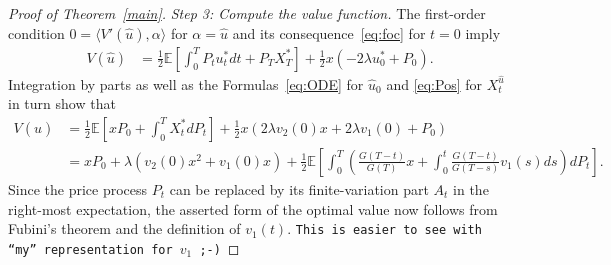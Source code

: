 \documentclass[11pt]{article}
\theoremstyle{definition}
\theoremstyle{remark}
\newcommand{\E}{\mathbb{E}} %
\newcommand{\ts}{\textstyle}
\begin{document}
\begin{proof}[Proof of Theorem~\ref{main}]
\emph{Step 3: Compute the value function.}
The first-order condition $0=\langle V'(\hat{u}), \alpha \rangle$ for $\alpha=\hat{u}$ and its consequence~\eqref{eq:foc} for $t=0$ imply
\begin{align*}
V(\hat{u}) &= \frac{1}{2}\E\left[\int_0^T P_t u^\ast_t dt + P_T X^\ast_T \right] + \frac{1}{2}x(-2\lambda u^\ast_0 + P_0).
\end{align*}
Integration by parts as well as the Formulas~\eqref{eq:ODE} for $\hat{u}_0$ and \eqref{eq:Pos} for $X^{\hat{u}}_t$ in turn show that
\begin{align*}
V(\hat{u}) &=\frac{1}{2}\E\left[xP_0 + \int_0^T X^\ast_t dP_t \right] + \frac{1}{2}x(2\lambda v_2(0)x + 2\lambda v_1(0) + P_0)\\
&= xP_0 + \lambda(v_2(0)x^2+v_1(0)x) + \frac{1}{2}\E\left[\int_0^T \left(\frac{G(T-t)}{G(T)}x + \int_0^t \frac{G(T-t)}{G(T-s)}v_1(s) ds\right) dP_t\right].
\end{align*}
Since the price process $P_t$ can be replaced by its finite-variation part $A_t$ in the right-most expectation, the asserted form of the optimal value now follows from Fubini's theorem and the definition of $v_1(t)$. \texttt{This is easier to see with ``my'' representation for $v_1$ ;-)}

\end{proof}
\end{document}
